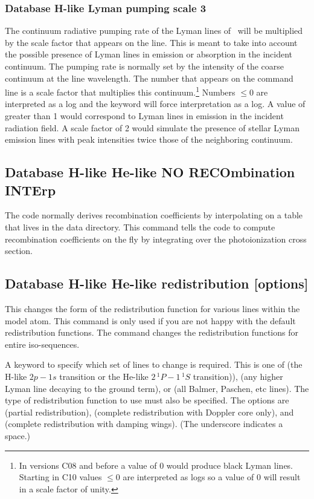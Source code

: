 \subsubsection{Database H-like Lyman pumping scale 3}
The continuum radiative pumping rate
of the Lyman lines of \hi\ will be multiplied by the scale factor
that appears on the line.
This is meant to take into account the possible presence of
Lyman lines in emission or absorption in the incident continuum.
The pumping
rate is normally set by the intensity of the coarse continuum at the line
wavelength.
The number that appears on the command line is a scale factor
that multiplies this continuum.\footnote{In versions C08 and before a value of 0 would produce black Lyman lines.
Starting in C10 values $\le 0$ are interpreted as logs
so a value of 0 will result in a scale factor of unity.}
Numbers $\le 0$ are interpreted as a log and
the  keyword will force interpretation as a log.
A value of greater than 1 would correspond to Lyman lines
in emission in the incident radiation field.
A scale factor of 
2 would simulate the presence of stellar Lyman emission lines with peak
intensities twice those of the neighboring continuum.

\subsection{Database H-like \OR{} He-like NO RECOmbination INTErp}

The code normally derives recombination coefficients by interpolating
on a table that lives in the data directory.
This command tells the code
to compute recombination coefficients on the fly by integrating over the
photoionization cross section.

\subsection{Database H-like \OR{} He-like  redistribution [options]}

This changes the form of the redistribution
function for various lines within the model atom.
This command is only
used if you are not happy with the default redistribution functions.
The command changes the redistribution functions for entire iso-sequences.

A keyword to specify which set of lines to change is required.
This is one of  (the H-like $2p - 1s$ transition or the He-like
$2\, ^1P - 1\, ^1S$ transition)),  (any higher Lyman line
decaying to the ground term), or 
(all Balmer, Paschen, etc lines).
The type of redistribution function to use must also be specified.
The options are  (partial redistribution),  (complete redistribution
with Doppler core only), and 
(complete redistribution with damping wings).
(The underscore indicates a space.)

